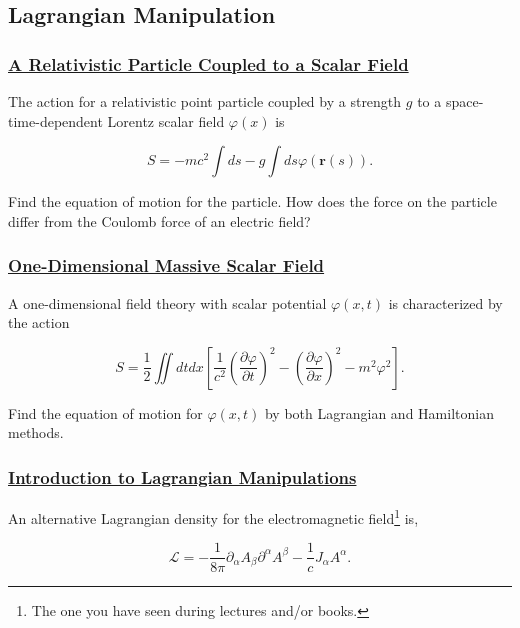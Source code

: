 \subsection{Lagrangian Manipulation}

\subsubsection{\hyperref[A Relativistic Particle Coupled to a Scalar Field]{A Relativistic Particle Coupled to a Scalar Field}}

The action for a relativistic point particle coupled by a strength $g$ to a space-time-dependent Lorentz scalar field $\varphi(x)$ is

\begin{equation}
	S=-m c^{2} \int d s-g \int d s \varphi(\mathbf{r}(s)).
\end{equation}

Find the equation of motion for the particle. How does the force on the particle differ from the Coulomb force of an electric field?

\subsubsection{\hyperref[One-Dimensional Massive Scalar Field]{One-Dimensional Massive Scalar Field}}

A one-dimensional field theory with scalar potential $\varphi(x, t)$ is characterized by the action

\begin{equation}
	S=\frac{1}{2} \iint d t d x\left[\frac{1}{c^{2}}\left(\frac{\partial \varphi}{\partial t}\right)^{2}-\left(\frac{\partial \varphi}{\partial x}\right)^{2}-m^{2} \varphi^{2}\right].
\end{equation}

Find the equation of motion for $\varphi(x, t)$ by both Lagrangian and Hamiltonian methods.


\subsubsection{\hyperref[Introduction to Lagrangian Manipulations]{Introduction to Lagrangian Manipulations}}

An alternative Lagrangian density for the electromagnetic field\footnote{The one you have seen during lectures and/or books.} is,

\begin{equation}\label{alternativelagrangian}
	\mathcal{L} = -\frac{1}{8\pi} \partial_{\alpha} A_{\beta}\partial^{\alpha} A^{\beta} - \frac{1}{c}J_{\alpha}A^{\alpha}.
\end{equation}

